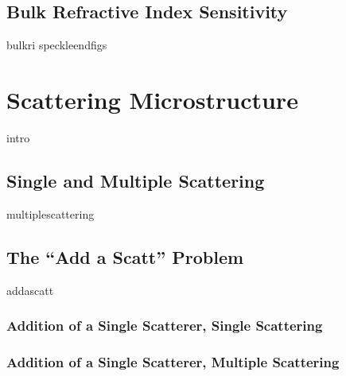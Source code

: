\documentclass[12pt,a4paper,titlepage,onecolumn]{report}
\begin{document}
\section{Bulk Refractive Index Sensitivity} \label{sec:bulkri}
{bulkri}
\newpage
{speckleendfigs}

\chapter{Scattering Microstructure} \label{ch:scatteringmicro}
{intro}
\section{Single and Multiple Scattering}
{multiplescattering}
\section{The ``Add a Scatt'' Problem}
{addascatt}
\subsection{Addition of a Single Scatterer, Single Scattering}
\subsection{Addition of a Single Scatterer, Multiple Scattering}
\end{document}
